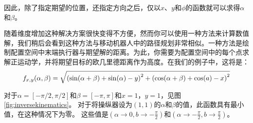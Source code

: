 

因此，除了指定期望的位置，还指定方向之后，仅以$x$、$y$和$\phi$的函数就可以求得$\alpha$和$\beta$。

随着维度增加这种解决方案很快变得不方便，然而你可以使用一种方法来计算数值解，我们稍后会看到这种方法与移动机器人中的路径规划非常相似。一种方法是绘制配置空间中末端执行器与期望解的距离。为此，你需要为配置空间中的每个点求解正运动学，并将期望目标的欧几里德距离作为高度。在我们的例子中，这将是：
\begin{equation}
\small
f_{x,y}(\alpha,\beta)=\sqrt{\left(\sin(\alpha + \beta) + \sin(\alpha) - y\right)^2 + \left(\cos(\alpha+\beta)+\cos(a) - x\right)^2}
\end{equation}


对于$ \alpha = [ - \pi / 2, \pi / 2] $和$ \beta = [ - \pi, \pi] $和$ x = 1 $，$ y = 1 $，见图\ref{fig:inversekinematics}。 对于将操纵器设为$(1, 1)$的$ \alpha $和$ \beta $的值，此函数具有最小值，在这种情况下为零。 这些值是$(\alpha \rightarrow 0, b \rightarrow - \frac {\pi} {2})$和$(\alpha \rightarrow - \frac {\pi} {2}, b \rightarrow \frac {\pi} {2})$。

